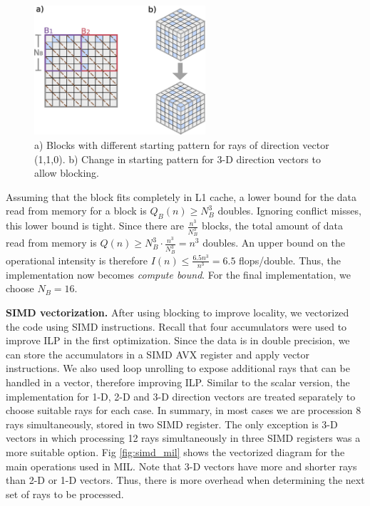 \documentclass[letterpaper]{article}
\newcommand{\mypar}[1]{{\bf #1.}}
\begin{document}
\begin{figure}[h]
    \centering
    \includegraphics[width=2.5in]{figs/heterogeneous_blocking.eps}
    \caption{a) Blocks with different starting pattern for rays of direction vector (1,1,0). b) Change in starting pattern for 3-D direction vectors to allow blocking.}
    \label{fig:start_pattern}
\end{figure}

Assuming that the block fits completely in L1 cache, a lower bound for the data read from memory for a block is $Q_B(n) \geq N_B^3$ doubles. Ignoring conflict misses, this lower bound is tight. Since there are $\frac{n^3}{N_B^3}$ blocks, the total amount of data read from memory is $Q(n) \geq N_B^3 \cdot \frac{n^3}{N_B^3} = n^3$ doubles. An upper bound on the operational intensity is therefore $I(n) \leq \frac{6.5n^3}{n^3} = 6.5$ flops/double. Thus, the implementation now becomes \textit{compute bound}. For the final implementation, we choose $N_B = 16$.

\mypar{SIMD vectorization}
After using blocking to improve locality, we vectorized the code using SIMD instructions. Recall that four accumulators were used to improve ILP in the first optimization. Since the data is in double precision, we can store the accumulators in a SIMD AVX register and apply vector instructions. We also used loop unrolling to expose additional rays that can be handled in a vector, therefore improving ILP. Similar to the scalar version, the implementation for 1-D, 2-D and 3-D direction vectors are treated separately to choose suitable rays for each case. In summary, in most cases we are procession 8 rays simultaneously, stored in two SIMD register. The only exception is 3-D vectors in which processing 12 rays simultaneously in three SIMD registers was a more suitable option. 
Fig \ref{fig:simd_mil} shows the vectorized diagram for the main operations used in MIL.
Note that 3-D vectors have more and shorter rays than 2-D or 1-D vectors. Thus, there is more overhead when determining the next set of rays to be processed.
\end{document}
